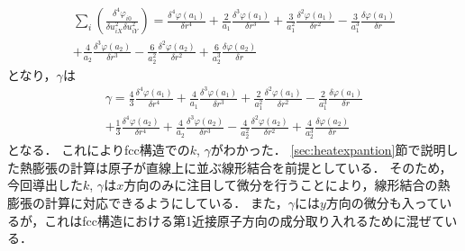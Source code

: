 \begin{eqnarray}
\label{eq:moment23}
\sum_i \left(\frac{\delta^4\varphi_{i0}}{\delta u_{iX}^2\delta u_{iY}^2}\right)=
\frac{\delta^4 \varphi(a_1)}{\delta r^4}
+\frac{2}{a_1}\frac{\delta^3 \varphi(a_1)}{\delta r^3}
+\frac{3}{a_1^2}\frac{\delta^2 \varphi(a_1)}{\delta r^2}
-\frac{3}{a_1^3}\frac{\delta \varphi(a_1)}{\delta r}\nonumber\\
+\frac{4}{a_2}\frac{\delta^3 \varphi(a_2)}{\delta r^3}
-\frac{6}{a_2^2}\frac{\delta^2 \varphi(a_2)}{\delta r^2}
+\frac{6}{a_2^3}\frac{\delta \varphi(a_2)}{\delta r}
\end{eqnarray}
となり，$\gamma$は
\begin{eqnarray}
\label{eq:gamma}
\gamma=
\frac{4}{3}\frac{\delta^4 \varphi(a_1)}{\delta r^4}
+\frac{4}{a_1}\frac{\delta^3 \varphi(a_1)}{\delta r^3}
+\frac{2}{a_1^2}\frac{\delta^2 \varphi(a_1)}{\delta r^2}
-\frac{2}{a_1^3}\frac{\delta \varphi(a_1)}{\delta r}\nonumber\\
+\frac{1}{3}\frac{\delta^4 \varphi(a_2)}{\delta r^4}
+\frac{4}{a_2}\frac{\delta^3 \varphi(a_2)}{\delta r^3}
-\frac{4}{a_2^2}\frac{\delta^2 \varphi(a_2)}{\delta r^2}
+\frac{4}{a_2^3}\frac{\delta \varphi(a_2)}{\delta r}
\end{eqnarray}
となる．
これによりfcc構造での$k$, $\gamma$がわかった．
\ref{sec:heatexpantion}節で説明した熱膨張の計算は原子が直線上に並ぶ線形結合を前提としている．
そのため，今回導出した$k$, $\gamma$は$x$方向のみに注目して微分を行うことにより，線形結合の熱膨張の計算に対応できるようにしている．
また，$\gamma$には$y$方向の微分も入っているが，これはfcc構造における第1近接原子方向の成分取り入れるために混ぜている．



